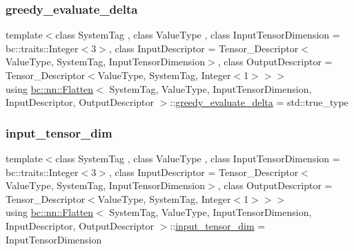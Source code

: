 \subsubsection{\texorpdfstring{greedy\+\_\+evaluate\+\_\+delta}{greedy\_evaluate\_delta}}
{\footnotesize\ttfamily template$<$class System\+Tag , class Value\+Type , class Input\+Tensor\+Dimension  = bc\+::traits\+::\+Integer$<$3$>$, class Input\+Descriptor  = Tensor\+\_\+\+Descriptor$<$\+Value\+Type, System\+Tag, Input\+Tensor\+Dimension$>$, class Output\+Descriptor  = Tensor\+\_\+\+Descriptor$<$\+Value\+Type, System\+Tag, Integer$<$1$>$$>$$>$ \\
using \hyperlink{structbc_1_1nn_1_1Flatten}{bc\+::nn\+::\+Flatten}$<$ System\+Tag, Value\+Type, Input\+Tensor\+Dimension, Input\+Descriptor, Output\+Descriptor $>$\+::\hyperlink{structbc_1_1nn_1_1Flatten_afd38f0f24bbf98d7f5ecb70198a16b16}{greedy\+\_\+evaluate\+\_\+delta} =  std\+::true\+\_\+type}

\mbox{\label{structbc_1_1nn_1_1Flatten_a33099a8688031a672bd911871d9ae0d2}} 
\subsubsection{\texorpdfstring{input\+\_\+tensor\+\_\+dim}{input\_tensor\_dim}}
{\footnotesize\ttfamily template$<$class System\+Tag , class Value\+Type , class Input\+Tensor\+Dimension  = bc\+::traits\+::\+Integer$<$3$>$, class Input\+Descriptor  = Tensor\+\_\+\+Descriptor$<$\+Value\+Type, System\+Tag, Input\+Tensor\+Dimension$>$, class Output\+Descriptor  = Tensor\+\_\+\+Descriptor$<$\+Value\+Type, System\+Tag, Integer$<$1$>$$>$$>$ \\
using \hyperlink{structbc_1_1nn_1_1Flatten}{bc\+::nn\+::\+Flatten}$<$ System\+Tag, Value\+Type, Input\+Tensor\+Dimension, Input\+Descriptor, Output\+Descriptor $>$\+::\hyperlink{structbc_1_1nn_1_1Flatten_a33099a8688031a672bd911871d9ae0d2}{input\+\_\+tensor\+\_\+dim} =  Input\+Tensor\+Dimension}

\mbox{\label{structbc_1_1nn_1_1Flatten_a15ddd4e65597ff56624b08d498a47c6d}} 
